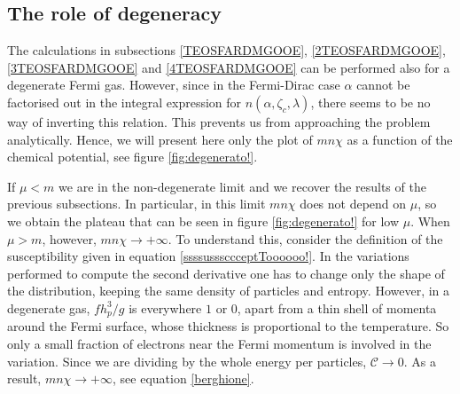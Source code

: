 \documentclass[useAMS,usenatbib,prd,twocolumn,nofootinbib]{revtex4-1}
\begin{document}
\subsection{The role of degeneracy}

The calculations  in subsections \ref{TEOSFARDMGOOE}, \ref{2TEOSFARDMGOOE}, \ref{3TEOSFARDMGOOE} and \ref{4TEOSFARDMGOOE} can be performed also for a degenerate Fermi gas. 
However, since in the Fermi-Dirac case $\alpha$ cannot be factorised out in the integral expression for $n(\alpha,\zeta_c,\lambda)$, there seems to be no way of inverting this relation. This prevents us from approaching the problem analytically. Hence, we will present here only the plot of $mn\chi$ as a function of the chemical potential, see figure \ref{fig:degenerato!}. 

If $\mu < m$ we are in the non-degenerate limit and we recover the results of the previous subsections. In particular, in this limit $mn\chi$ does not depend on $\mu$, so we obtain the plateau that can be seen in figure \ref{fig:degenerato!} for low $\mu$. When $\mu>m$, however, $mn\chi \longrightarrow + \infty$. To understand this, consider the definition of the susceptibility given in equation \eqref{ssssusssccceptToooooo!}. In the variations performed to compute the second derivative one has to change only the shape of the distribution, keeping the same density of particles and entropy. However, in a degenerate gas, $f h_p^3/g$ is everywhere $1$ or 0, apart from a thin shell of momenta around the Fermi surface, whose thickness is proportional to the temperature. So only a small fraction of electrons near the Fermi momentum is involved in the variation. Since we are dividing by the whole energy per particles, $\mathcal{C} \longrightarrow 0$.  As a result, $mn\chi \longrightarrow +\infty$, see equation \eqref{berghione}.
\end{document}
